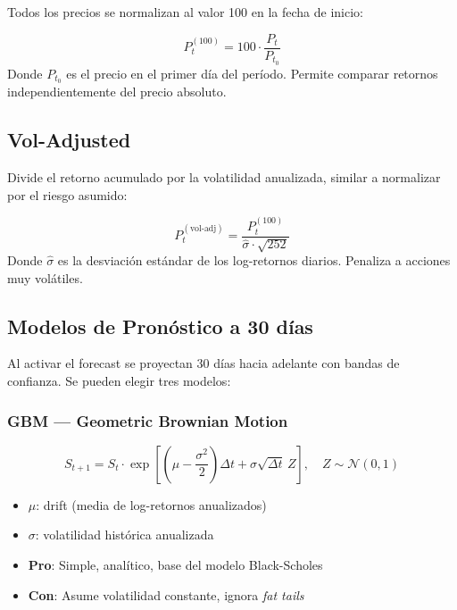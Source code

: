 \documentclass[11pt, a4paper]{article}
\begin{document}
Todos los precios se normalizan al valor 100 en la fecha de inicio:

\begin{formulabox}
  \[ P_t^{(100)} = 100 \cdot \frac{P_t}{P_{t_0}} \]
  Donde $P_{t_0}$ es el precio en el primer día del período. Permite comparar retornos independientemente del precio absoluto.
\end{formulabox}

\subsection{Vol-Adjusted}

Divide el retorno acumulado por la volatilidad anualizada, similar a normalizar por el riesgo asumido:

\begin{formulabox}
  \[ P_t^{(\text{vol-adj})} = \frac{P_t^{(100)}}{\hat{\sigma} \cdot \sqrt{252}} \]
  Donde $\hat{\sigma}$ es la desviación estándar de los log-retornos diarios. Penaliza a acciones muy volátiles.
\end{formulabox}

\subsection{Modelos de Pronóstico a 30 días}

Al activar el forecast se proyectan 30 días hacia adelante con bandas de confianza. Se pueden elegir tres modelos:

\subsubsection{GBM — Geometric Brownian Motion}

\begin{formulabox}[GBM]
  \[ S_{t+1} = S_t \cdot \exp\!\left[\left(\mu - \frac{\sigma^2}{2}\right)\Delta t + \sigma \sqrt{\Delta t}\, Z\right], \quad Z \sim \mathcal{N}(0,1) \]
  \begin{itemize}
    \item $\mu$: drift (media de log-retornos anualizados)
    \item $\sigma$: volatilidad histórica anualizada
    \item \textbf{Pro}: Simple, analítico, base del modelo Black-Scholes
    \item \textbf{Con}: Asume volatilidad constante, ignora \textit{fat tails}
  \end{itemize}
\end{formulabox}
\end{document}

